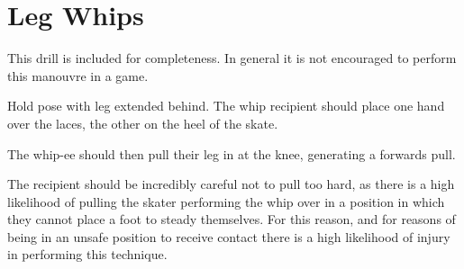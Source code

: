 \section*{Leg Whips}
\label{sec:whips/leg_whip}

This drill is included for completeness. In general it is not encouraged to perform this manouvre in a game. 


Hold pose with leg extended behind.
The whip recipient should place one hand over the laces, the other on the heel of the skate.  

The whip-ee should then pull their leg in at the knee, generating a forwards pull. 

The recipient should be incredibly careful not to pull too hard, as there is a high likelihood of pulling the skater performing the whip over in a position in which they cannot place a foot to steady themselves.
For this reason, and for reasons of being in an unsafe position to receive contact there is a high likelihood of injury in performing this technique.
